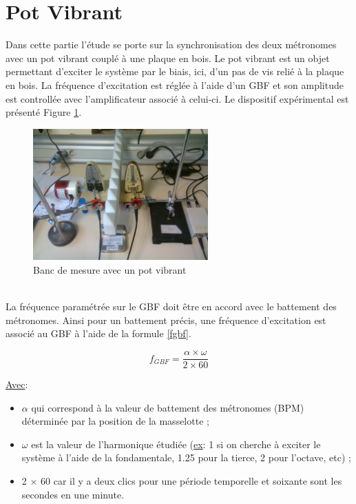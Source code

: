 \documentclass[a4paper,11pt]{report}
\begin{document}
\section{Pot Vibrant}
Dans cette partie l'étude se porte sur la synchronisation des deux métronomes avec un pot vibrant couplé à une plaque en bois. Le pot vibrant est un objet permettant d'exciter le système par le biais, ici, d'un pas de vis relié à la plaque en bois. La fréquence d'excitation est réglée à l'aide d'un GBF et son amplitude est controllée avec l'amplificateur associé à celui-ci. Le dispositif expérimental est présenté Figure \ref{BancPot}.\\
\begin{figure}[h]
\centering
\includegraphics[width=0.6\textwidth]{Bancpotvibrant}
\caption{Banc de mesure avec un pot vibrant}\label{BancPot}
\end{figure}\\
La fréquence paramétrée sur le GBF doit être en accord avec le battement des métronomes. Ainsi pour un battement précis, une fréquence d'excitation est associé au GBF à l'aide de la formule \ref{fgbf}.

\begin{equation}
f_{GBF}=\frac{\alpha \times \omega}{2 \times 60}
\label{fgbf}
\end{equation}

\underline{Avec}:\\
\begin{itemize}[label=\textbullet, leftmargin=* ,parsep=0cm,itemsep=0cm,topsep=0cm,font=\tiny]
\item $\alpha$ qui correspond à la valeur de battement des métronomes (BPM) déterminée par la position de la masselotte ;
\item $\omega$ est la valeur de l'harmonique étudiée (\underline{ex}: 1 si on cherche à exciter le système à l'aide de la fondamentale, 1.25 pour la tierce, 2 pour l'octave, etc) ;
\item 2 $\times$ 60 car il y a deux clics pour une période temporelle et soixante sont les secondes en une minute.\\
\end{itemize}
\end{document}
